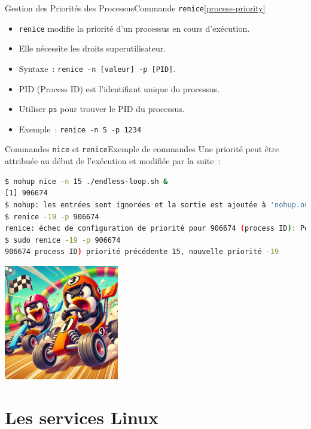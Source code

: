 \documentclass{beamer}
\begin{document}
    \begin{frame}{Gestion des Priorités des Processus}{Commande \lstinline{renice}\cref{process-priority}}
        \begin{itemize}
            \item \lstinline{renice} modifie la priorité d'un processus en cours d'exécution.
            \item Elle nécessite les droits superutilisateur.
            \item Syntaxe~: \lstinline{renice -n [valeur] -p [PID]}.
            \item PID (Process ID) est l'identifiant unique du processus.
            \item Utiliser \lstinline{ps} pour trouver le PID du processus.
            \item Exemple~: \lstinline{renice -n 5 -p 1234}
        \end{itemize}
    \end{frame}

    \begin{frame}[fragile]{Commandes \lstinline{nice} et \lstinline{renice}}{Exemple de commandes}
        Une priorité peut être attribuée au début de l'exécution et modifiée par la suite~:
        \begin{lstlisting}[language=bash]
$ nohup nice -n 15 ./endless-loop.sh &
[1] 906674
$ nohup: les entrées sont ignorées et la sortie est ajoutée à 'nohup.out'
$ renice -19 -p 906674
renice: échec de configuration de priorité pour 906674 (process ID): Permission non accordée
$ sudo renice -19 -p 906674
906674 process ID) priorité précédente 15, nouvelle priorité -19
        \end{lstlisting}
        \begin{center}
            \includegraphics[width=5cm]{image/pinguins-racing}
        \end{center}
    \end{frame}


    \section{Les services Linux}\label{sec:les-services}
\end{document}
